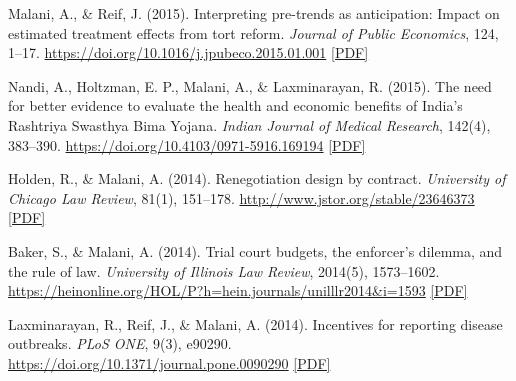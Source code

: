 \begin{tablist}
        \item[2015] \tab{}Malani, A., \& Reif, J. (2015). Interpreting pre-trends as anticipation: Impact on estimated treatment effects from tort reform. \textit{Journal of Public Economics}, 124, 1–17. \href{https://doi.org/10.1016/j.jpubeco.2015.01.001}{https://doi.org/10.1016/j.jpubeco.2015.01.001} \href{https://github.com/anup-malani/website_personal/blob/main/publications/2015_MalaniReif_JPubEc_Anticipation.pdf}{[PDF]}
        
        \item[2015] \tab{}Nandi, A., Holtzman, E. P., Malani, A., \& Laxminarayan, R. (2015). The need for better evidence to evaluate the health and economic benefits of India's Rashtriya Swasthya Bima Yojana. \textit{Indian Journal of Medical Research}, 142(4), 383–390. \href{https://journals.lww.com/ijmr/fulltext/2015/42040/the_need_for_better_evidence_to_evaluate_the.6.aspx}{https://doi.org/10.4103/0971-5916.169194} \href{https://github.com/anup-malani/website_personal/blob/main/publications/2015_NandiMalaniEtAl_IJMR_IndiaHealthInsurance.pdf}{[PDF]}
        
        \item[2014] \tab{}Holden, R., \& Malani, A. (2014). Renegotiation design by contract. \textit{University of Chicago Law Review}, 81(1), 151–178. \href{http://www.jstor.org/stable/23646373}{http://www.jstor.org/stable/23646373} \href{https://github.com/anup-malani/website_personal/blob/main/publications/2014_HoldenMalani_UCLR_Renegotiation.pdf}{[PDF]}
        
        \item[2014] \tab{}Baker, S., \& Malani, A. (2014). Trial court budgets, the enforcer's dilemma, and the rule of law. \textit{University of Illinois Law Review}, 2014(5), 1573–1602. \href{https://heinonline.org/HOL/P?h=hein.journals/unilllr2014&i=1593}{https://heinonline.org/HOL/P?h=hein.journals/unilllr2014\&i=1593} \href{https://github.com/anup-malani/website_personal/blob/main/publications/2014_BakerMalani_UIllLRev_EnforcersDilemma.pdf}{[PDF]}
        
        \item[2014] \tab{}Laxminarayan, R., Reif, J., \& Malani, A. (2014). Incentives for reporting disease outbreaks. \textit{PLoS ONE}, 9(3), e90290. \href{https://doi.org/10.1371/journal.pone.0090290}{https://doi.org/10.1371/journal.pone.0090290} \href{https://github.com/anup-malani/website_personal/blob/main/publications/2014_LaxminarayanReifMalani_PLOSOne_IncentivesDiseaseReporting.pdf}{[PDF]}
    

\end{tablist}
